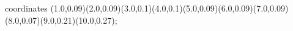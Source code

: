 					coordinates { (1.0,0.09)(2.0,0.09)(3.0,0.1)(4.0,0.1)(5.0,0.09)(6.0,0.09)(7.0,0.09)(8.0,0.07)(9.0,0.21)(10.0,0.27)};